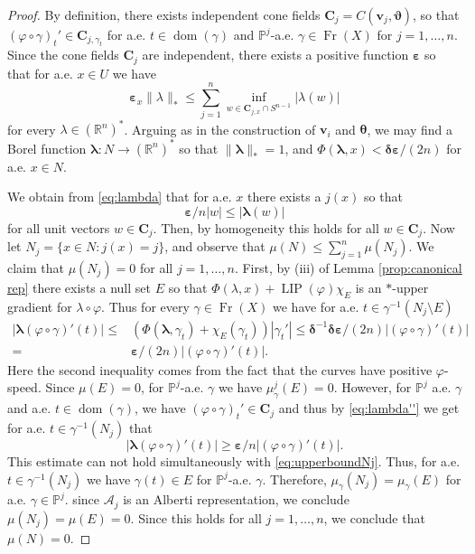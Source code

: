 \documentclass{amsart}
\numberwithin{equation}{section}
\newcommand{\R}{\mathbb{R}}
\renewcommand{\P}{\mathbb{P}}
\newcommand{\LIP}{\operatorname{LIP}}
\newcommand{\dom}{\operatorname{dom}}
\newcommand{\Fr}{\operatorname{Fr}}
\newcommand{\inv}{^{-1}}
\begin{document}
\begin{proof}
By definition, there exists independent cone fields $\bm C_j = C(\bm v_j, \bm \vartheta)$, so that $(\varphi \circ \gamma)_t' \in \bm C_{j,\gamma_t}$ for a.e. $t\in \dom(\gamma)$ and $\P^j$-a.e. $\gamma \in \Fr(X)$ for $j=1,\dots, n$. Since the cone fields $\bm C_j$ are independent, there exists a  positive function $\bm \varepsilon$ so that for a.e. $x\in U$ we have
\begin{equation}\label{eq:lambda}
\bm \varepsilon_x\|\lambda\|_{*} \leq \sum_{j=1}^n \inf_{w \in \bm C_{j,x}\cap S^{n-1}}|\lambda(w)| 
\end{equation}
for every $\lambda \in (\R^n)^*$. Arguing as in the construction of $\bm v_i$ and $\bm \theta$, we may find a Borel function $\bm\lambda:N\to (\R^n)^*$ so that $\|\bm\lambda\|_*=1$, and $\Phi(\bm\lambda,x)<\bm\delta \bm\varepsilon/(2n)$ for a.e. $x\in N$.  

We obtain from \eqref{eq:lambda} that for a.e. $x$ there exists a $j(x)$ so that 
\begin{equation}\label{eq:lambda''}
\bm \varepsilon/n|w| \leq |\bm\lambda(w)|
\end{equation}
for all unit vectors $w\in \bm C_j$. Then, by homogeneity this holds for all $w\in \bm C_j$. Now let $N_j = \{x\in N: j(x)=j\}$, and observe that $\mu(N)\leq \sum_{j=1}^n \mu(N_j)$. We claim that $\mu(N_j)=0$ for all $j=1,\dots, n$. First, by (iii) of Lemma \ref{prop:canonical rep}  there exists a null set $E$ so that $\Phi(\lambda, x)+\LIP(\varphi)\chi_E$ is an $\ast$-upper gradient for $\lambda \circ \varphi$. Thus for every $\gamma\in \Fr(X)$ we have for a.e. $t\in \gamma\inv(N_j\setminus E)$ 
        \begin{align}
        |\bm\lambda(\varphi \circ \gamma)'(t)| \leq & (\Phi(\bm\lambda, \gamma_t) +\chi_E(\gamma_t))|\gamma_t'| \label{eq:upperboundNj}\leq \bm\delta^{-1} \bm \delta \bm\varepsilon/(2n) |(\varphi \circ \gamma)'(t)|\\
        =&\bm\varepsilon/(2n) |(\varphi \circ \gamma)'(t)|.\nonumber
        \end{align}
        Here the second inequality comes from the fact that the curves have positive $\varphi$-speed. Since $\mu(E)=0$, for $\P^j$-a.e. $\gamma$ we have $\mu_{\gamma}^j(E)=0$. However, for $\P^j$ a.e. $\gamma$ and a.e. $t\in \dom(\gamma)$, we have $(\varphi \circ \gamma)_t' \in \bm C_j$ and thus by \eqref{eq:lambda''} we get for a.e. $t\in \gamma\inv(N_j)$ that
\[
|\bm\lambda(\varphi \circ \gamma)'(t)| \geq \bm \varepsilon/ n |(\varphi \circ \gamma)'(t)|.
\]
This estimate can not hold simultaneously with \eqref{eq:upperboundNj}. Thus, for a.e. $t\in \gamma\inv(N_j)$ we have $\gamma(t)\in E$ for $\P^j$-a.e. $\gamma$. Therefore, $\mu_{\gamma}(N_j) = \mu_{\gamma}(E)$ for a.e. $\gamma\in \P^j$.  since $\mathcal A_j$ is an Alberti representation, we conclude $\mu(N_j)=\mu(E)=0$. Since this holds for all $j=1, \dots, n$, we conclude that $\mu(N)=0$.

\end{proof}
\end{document}

